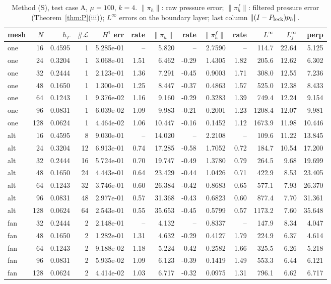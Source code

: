 \begin{table}[h]\centering\small
\caption{Method (S), test case A, $\mu=100$, $k=4$. $\|\pi_h\|$: raw pressure error; $\|\pi_h^f\|$: filtered pressure error (Theorem~\ref{thm:P}(iii)); $L^\infty$ errors on the boundary layer; last column $\|(I-P_{\rm lock})p_h\|$.}\label{tab:filter}
\begin{tabular}{lrrrrrrrrrrrr}\toprule
mesh & $N$ & $h_\Gamma$ & $\#\mathcal L$ & $H^1$ err & rate & $\|\pi_h\|$ & rate & $\|\pi_h^f\|$ & rate & $L^\infty$ & $L^\infty_f$ & perp\\\midrule
one & 16 & 0.4595 & 1 & 5.285e-01 & -- & 5.820 & -- & 2.7590 & -- & 114.7 & 22.64 & 5.125\\
one & 24 & 0.3204 & 1 & 3.068e-01 & 1.51 & 6.462 & -0.29 & 1.4305 & 1.82 & 205.6 & 12.62 & 6.302\\
one & 32 & 0.2444 & 1 & 2.123e-01 & 1.36 & 7.291 & -0.45 & 0.9003 & 1.71 & 308.0 & 12.55 & 7.236\\
one & 48 & 0.1650 & 1 & 1.300e-01 & 1.25 & 8.447 & -0.37 & 0.4863 & 1.57 & 525.0 & 12.38 & 8.433\\
one & 64 & 0.1243 & 1 & 9.376e-02 & 1.16 & 9.160 & -0.29 & 0.3283 & 1.39 & 749.4 & 12.24 & 9.154\\
one & 96 & 0.0831 & 1 & 6.039e-02 & 1.09 & 9.983 & -0.21 & 0.2001 & 1.23 & 1208.4 & 12.07 & 9.981\\
one & 128 & 0.0624 & 1 & 4.464e-02 & 1.06 & 10.447 & -0.16 & 0.1452 & 1.12 & 1673.9 & 11.98 & 10.446\\
alt & 16 & 0.4595 & 8 & 9.030e-01 & -- & 14.020 & -- & 2.2108 & -- & 109.6 & 11.22 & 13.845\\
alt & 24 & 0.3204 & 12 & 6.913e-01 & 0.74 & 17.285 & -0.58 & 1.7052 & 0.72 & 184.7 & 10.54 & 17.200\\
alt & 32 & 0.2444 & 16 & 5.724e-01 & 0.70 & 19.747 & -0.49 & 1.3780 & 0.79 & 264.5 & 9.68 & 19.699\\
alt & 48 & 0.1650 & 24 & 4.443e-01 & 0.64 & 23.429 & -0.44 & 1.0426 & 0.71 & 422.9 & 8.53 & 23.405\\
alt & 64 & 0.1243 & 32 & 3.746e-01 & 0.60 & 26.384 & -0.42 & 0.8683 & 0.65 & 577.1 & 7.93 & 26.370\\
alt & 96 & 0.0831 & 48 & 2.977e-01 & 0.57 & 31.368 & -0.43 & 0.6823 & 0.60 & 877.4 & 7.70 & 31.361\\
alt & 128 & 0.0624 & 64 & 2.543e-01 & 0.55 & 35.653 & -0.45 & 0.5799 & 0.57 & 1173.2 & 7.60 & 35.648\\
fan & 32 & 0.2444 & 2 & 2.148e-01 & -- & 4.132 & -- & 0.8337 & -- & 147.9 & 8.34 & 4.047\\
fan & 48 & 0.1650 & 2 & 1.282e-01 & 1.31 & 4.632 & -0.29 & 0.4127 & 1.79 & 224.9 & 6.37 & 4.614\\
fan & 64 & 0.1243 & 2 & 9.188e-02 & 1.18 & 5.224 & -0.42 & 0.2582 & 1.66 & 325.5 & 6.26 & 5.218\\
fan & 96 & 0.0831 & 2 & 5.935e-02 & 1.09 & 6.123 & -0.39 & 0.1419 & 1.49 & 553.3 & 6.44 & 6.121\\
fan & 128 & 0.0624 & 2 & 4.414e-02 & 1.03 & 6.717 & -0.32 & 0.0975 & 1.31 & 796.1 & 6.62 & 6.717\\
\bottomrule\end{tabular}\end{table}
